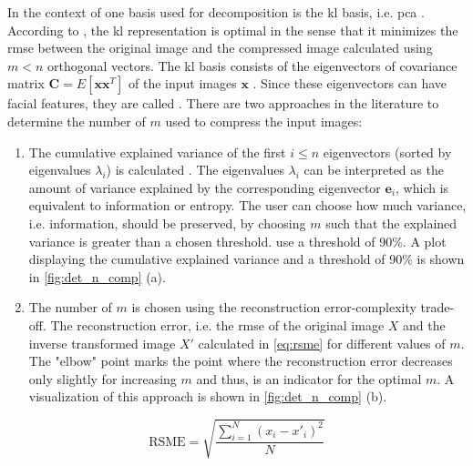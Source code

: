 In the context of \eigenfaces{} one basis used for decomposition is the \ac{kl} basis, i.e. \ac{pca} \cite{eigenfaces1997, eigenfaces1991}.
According to \citeauthor{eigenfaces1997}, the \ac{kl} representation is optimal in the sense that it minimizes the \ac{rmse} between the original image and 
the compressed image calculated using $m < n$ orthogonal vectors.
The \ac{kl} basis consists of the eigenvectors of covariance matrix $\textbf{C} = E\left[ \textbf{x}\textbf{x}^{T} \right]$ of the input images $\mathbf{x}$ \cite{eigenfaces1997}.
Since these eigenvectors can have facial features, they are called \textit{\eigenfaces{}}.
There are two approaches in the literature to determine the number of \eigenfaces{} $m$ used to compress the input images:
\begin{enumerate}[label=(\alph*)]
    \item The cumulative explained variance of the first $i \le n$ eigenvectors (sorted by eigenvalues $\lambda_i$) is calculated 
        \cite{eigenfaces1997, face-recognition2020, face-recognition2021}.
        The eigenvalues $\lambda_i$ can be interpreted as the amount of variance explained by the corresponding eigenvector $\textbf{e}_i$, which is equivalent to information or entropy.
        The user can choose how much variance, i.e. information, should be preserved, by choosing $m$ such that the explained variance is greater than a chosen threshold.
        \citeauthor{face-recognition2021} use a threshold of 90\%.
        A plot displaying the cumulative explained variance and a threshold of 90\% is shown in \autoref{fig:det_n_comp} (a).

    \item The number of \eigenfaces{} $m$ is chosen using the reconstruction error-complexity trade-off. %
        The reconstruction error, i.e. the \ac{rmse} of the original image $X$ and the inverse transformed image $X'$ 
        calculated in \autoref{eq:rsme} for different values of $m$.
        The "elbow" point marks the point where the reconstruction error decreases only slightly for increasing $m$ and thus, is an indicator for the optimal $m$.
        A visualization of this approach is shown in \autoref{fig:det_n_comp} (b).
\end{enumerate}

\begin{equation}
    \text{RSME} = \sqrt{\frac{\sum_{i=1}^{N}(x_{i}-x'_i)^2}{N}}
    \label{eq:rsme}
\end{equation}
 
